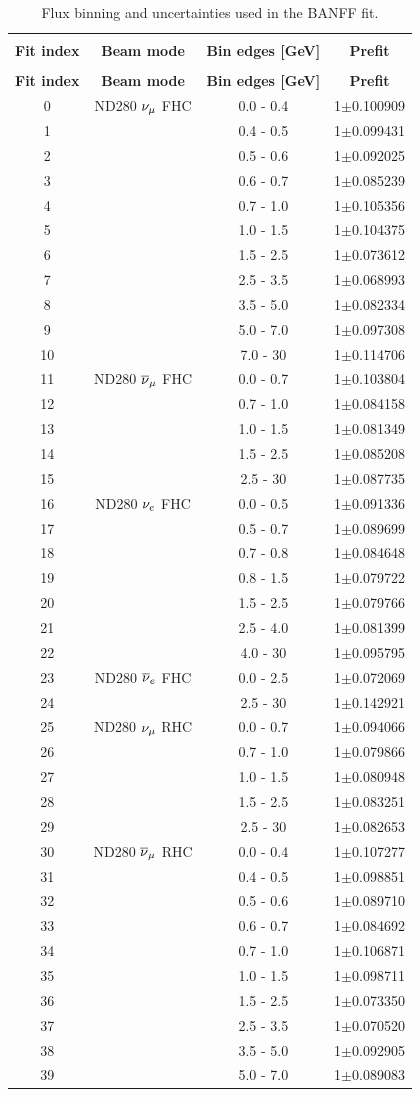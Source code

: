 \begin{center}
\begin{longtable}[c]{cccc}
\hline
\caption[Flux Binning and Uncertainties]{Flux binning and uncertainties used in the BANFF fit.\label{tab:Fluxbinning}}
\tabularnewline
\textbf{Fit index} & \textbf{Beam mode} & \textbf{Bin edges {[}GeV{]}} & \textbf{Prefit}\tabularnewline
\hline
\endfirsthead
\hline
\tabularnewline
\textbf{Fit index} & \textbf{Beam mode} & \textbf{Bin edges {[}GeV{]}} & \textbf{Prefit}\tabularnewline
\hline
\endhead 
0 & ND280 $\nu_{\mu}$ FHC & 0.0 - 0.4 & 1$\pm$0.100909\tabularnewline
1 &  & 0.4 - 0.5 & 1$\pm$0.099431\tabularnewline
2 &  & 0.5 - 0.6 & 1$\pm$0.092025\tabularnewline
3 &  & 0.6 - 0.7 & 1$\pm$0.085239\tabularnewline
4 &  & 0.7 - 1.0 & 1$\pm$0.105356\tabularnewline
5 &  & 1.0 - 1.5 & 1$\pm$0.104375\tabularnewline
6 &  & 1.5 - 2.5 & 1$\pm$0.073612\tabularnewline
7 &  & 2.5 - 3.5 & 1$\pm$0.068993\tabularnewline
8 &  & 3.5 - 5.0 & 1$\pm$0.082334\tabularnewline
9 &  & 5.0 - 7.0 & 1$\pm$0.097308\tabularnewline
10 &  & 7.0 - 30 & 1$\pm$0.114706\tabularnewline
11 & ND280 $\overline{\nu}_{\mu}$ FHC & 0.0 - 0.7 & 1$\pm$0.103804\tabularnewline
12 &  & 0.7 - 1.0 & 1$\pm$0.084158\tabularnewline
13 &  & 1.0 - 1.5 & 1$\pm$0.081349\tabularnewline
14 &  & 1.5 - 2.5 & 1$\pm$0.085208\tabularnewline
15 &  & 2.5 - 30 & 1$\pm$0.087735\tabularnewline
16 & ND280 $\nu_{e}$ FHC & 0.0 - 0.5 & 1$\pm$0.091336\tabularnewline
17 &  & 0.5 - 0.7 & 1$\pm$0.089699\tabularnewline
18 &  & 0.7 - 0.8 & 1$\pm$0.084648\tabularnewline
19 &  & 0.8 - 1.5 & 1$\pm$0.079722\tabularnewline
20 &  & 1.5 - 2.5 & 1$\pm$0.079766\tabularnewline
21 &  & 2.5 - 4.0 & 1$\pm$0.081399\tabularnewline
22 &  & 4.0 - 30 & 1$\pm$0.095795\tabularnewline
23 & ND280 $\overline{\nu}_{e}$ FHC & 0.0 - 2.5 & 1$\pm$0.072069\tabularnewline
24 &  & 2.5 - 30 & 1$\pm$0.142921\tabularnewline
25 & ND280 $\nu_{\mu}$ RHC & 0.0 - 0.7 & 1$\pm$0.094066\tabularnewline
26 &  & 0.7 - 1.0 & 1$\pm$0.079866\tabularnewline
27 &  & 1.0 - 1.5 & 1$\pm$0.080948\tabularnewline
28 &  & 1.5 - 2.5 & 1$\pm$0.083251\tabularnewline
29 &  & 2.5 - 30 & 1$\pm$0.082653\tabularnewline
30 & ND280 $\overline{\nu}_{\mu}$ RHC & 0.0 - 0.4 & 1$\pm$0.107277\tabularnewline
31 &  & 0.4 - 0.5 & 1$\pm$0.098851\tabularnewline
32 &  & 0.5 - 0.6 & 1$\pm$0.089710\tabularnewline
33 &  & 0.6 - 0.7 & 1$\pm$0.084692\tabularnewline
34 &  & 0.7 - 1.0 & 1$\pm$0.106871\tabularnewline
35 &  & 1.0 - 1.5 & 1$\pm$0.098711\tabularnewline
36 &  & 1.5 - 2.5 & 1$\pm$0.073350\tabularnewline
37 &  & 2.5 - 3.5 & 1$\pm$0.070520\tabularnewline
38 &  & 3.5 - 5.0 & 1$\pm$0.092905\tabularnewline
39 &  & 5.0 - 7.0 & 1$\pm$0.089083\tabularnewline

\end{longtable}
\end{center}
